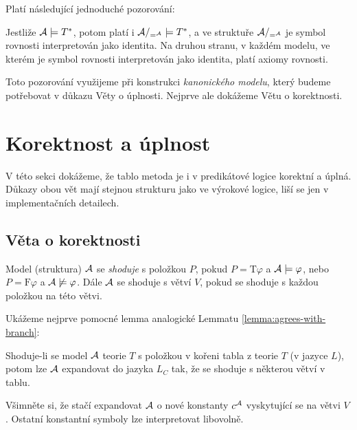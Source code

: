 Platí následující jednoduché pozorování:
\begin{observation}
    Jestliže $\mathcal{A}\models T^*$, potom platí i $\mathcal{A}/_{=^{\mathcal{A}}}\models T^*$, a ve struktuře $\mathcal{A}/_{=^{\mathcal{A}}}$ je symbol rovnosti interpretován jako identita. Na druhou stranu, v každém modelu, ve kterém je symbol rovnosti interpretován jako identita, platí axiomy rovnosti.
\end{observation}

Toto pozorování využijeme při konstrukci \emph{kanonického modelu}, který budeme potřebovat v důkazu Věty o úplnosti. Nejprve ale dokážeme Větu o korektnosti.

\section{Korektnost a úplnost}

V této sekci dokážeme, že tablo metoda je i v predikátové logice korektní a úplná. Důkazy obou vět mají stejnou strukturu jako ve výrokové logice, liší se jen v implementačních detailech.

\subsection{Věta o korektnosti}

Model (struktura) $\mathcal{A}$ se \emph{shoduje} s položkou $P$, pokud
$P=\mathrm{T}\varphi$ a $\mathcal{A}\models\varphi$, nebo $P=\mathrm{F}\varphi$ a $\mathcal{A}\not\models\varphi$. Dále $\mathcal{A}$ se shoduje s větví $V$, pokud se shoduje s každou položkou na této větvi.

Ukážeme nejprve pomocné lemma analogické Lemmatu \ref{lemma:agrees-with-branch}:
\begin{lemma}\label{lemma:agrees-with-branch-predicate}
    Shoduje-li se model $\mathcal{A}$ teorie $T$ s položkou v kořeni tabla z teorie $T$ (v jazyce $L$), potom lze $\mathcal{A}$ expandovat do jazyka $L_C$ tak, že se shoduje s některou větví v tablu.
\end{lemma}
Všimněte si, že stačí expandovat $\mathcal{A}$ o nové konstanty $c^{\mathcal{A}}$ vyskytující se na větvi $V$. Ostatní konstantní symboly lze interpretovat libovolně.

